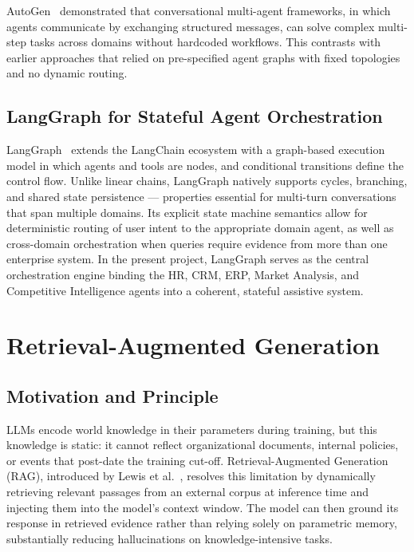 AutoGen~\cite{wu2023autogen} demonstrated that conversational multi-agent
frameworks, in which agents communicate by exchanging structured messages,
can solve complex multi-step tasks across domains without hardcoded
workflows. This contrasts with earlier approaches that relied on
pre-specified agent graphs with fixed topologies and no dynamic routing.

\subsection{LangGraph for Stateful Agent Orchestration}

LangGraph~\cite{langgraph2024} extends the LangChain ecosystem with a
graph-based execution model in which agents and tools are nodes, and
conditional transitions define the control flow. Unlike linear chains,
LangGraph natively supports cycles, branching, and shared state
persistence — properties essential for multi-turn conversations that span
multiple domains. Its explicit state machine semantics allow for
deterministic routing of user intent to the appropriate domain agent, as
well as cross-domain orchestration when queries require evidence from more
than one enterprise system. In the present project, LangGraph serves as the
central orchestration engine binding the HR, CRM, ERP, Market Analysis,
and Competitive Intelligence agents into a coherent, stateful assistive
system.

\section{Retrieval-Augmented Generation}

\subsection{Motivation and Principle}

LLMs encode world knowledge in their parameters during training, but this
knowledge is static: it cannot reflect organizational documents, internal
policies, or events that post-date the training cut-off. Retrieval-Augmented
Generation (RAG), introduced by Lewis et al.~\cite{lewis2020rag}, resolves
this limitation by dynamically retrieving relevant passages from an external
corpus at inference time and injecting them into the model's context window.
The model can then ground its response in retrieved evidence rather than
relying solely on parametric memory, substantially reducing hallucinations
on knowledge-intensive tasks.

